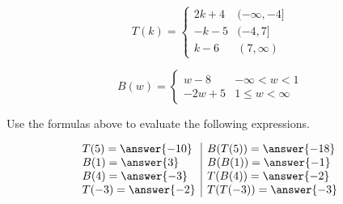 \documentclass{ximera}
\author{Lee Wayand}
\begin{document}
\begin{exercise}





\[
T(k) = 
\begin{cases}
  2k + 4 &  (-\infty, -4]   \\
  -k - 5 &  (-4, 7]  \\
  k - 6 & (7, \infty)
\end{cases}
\]












\[
B(w) = 
\begin{cases}
  w - 8 &   -\infty < w < 1 \\
  -2w + 5 &  1 \leq w < \infty
\end{cases}
\]










\begin{question}



Use the formulas above to evaluate the following expressions.



\[
\begin{array}{l|l}
T(5) = \answer{-10}  & B(T(5)) = \answer{-18}   \\
B(1) = \answer{3}  & B(B(1)) = \answer{-1}   \\
B(4) = \answer{-3}  & T(B(4)) = \answer{-2}   \\
T(-3) = \answer{-2}  & T(T(-3)) = \answer{-3}   
\end{array}
\]




\end{question}














\end{exercise}
\end{document}

